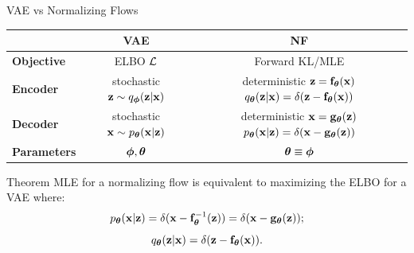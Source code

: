 \documentclass{beamer}
\begin{document}
\begin{frame}{VAE vs Normalizing Flows}
	\begin{table}[]
		\begin{tabular}{l|c|c}
			& \textbf{VAE} & \textbf{NF} \\ \hline
			\textbf{Objective} & ELBO $\mathcal{L}$ & Forward KL/MLE \\ \hline
			\textbf{Encoder} & \shortstack{stochastic \\ $\mathbf{z} \sim q_{\boldsymbol{\phi}}(\mathbf{z}| \mathbf{x})$} &  \shortstack{\\ deterministic \\ $\mathbf{z} = \mathbf{f}_{\boldsymbol{\theta}}(\mathbf{x})$ \\ $q_{\boldsymbol{\theta}}(\mathbf{z}| \mathbf{x}) = \delta(\mathbf{z} - \mathbf{f}_{\boldsymbol{\theta}}(\mathbf{x}))$}  \\ \hline
			\textbf{Decoder} & \shortstack{stochastic \\ $\mathbf{x} \sim p_{\boldsymbol{\theta}}(\mathbf{x}| \mathbf{z})$} & \shortstack{\\ deterministic \\ $\mathbf{x} = \mathbf{g}_{\boldsymbol{\theta}}(\mathbf{z})$ \\ $ p_{\boldsymbol{\theta}}(\mathbf{x} | \mathbf{z}) = \delta(\mathbf{x} - \mathbf{g}_{\boldsymbol{\theta}}(\mathbf{z}))$} \\ \hline
			\textbf{Parameters}  & $\boldsymbol{\phi}, \boldsymbol{\theta}$ & $\boldsymbol{\theta} \equiv \boldsymbol{\phi}$\\ 
		\end{tabular}
	\end{table}
	\vspace{-0.3cm}
	\eqpause
	\begin{block}{Theorem}
		MLE for a normalizing flow is equivalent to maximizing the ELBO for a VAE where:
		\vspace{-0.3cm}
		\[
			p_{\boldsymbol{\theta}}(\mathbf{x} | \mathbf{z}) = \delta (\mathbf{x} - \mathbf{f}^{-1}_{\boldsymbol{\theta}}(\mathbf{z})) = \delta (\mathbf{x} - \mathbf{g}_{\boldsymbol{\theta}}(\mathbf{z}));
		\]
		\[
			q_{\boldsymbol{\theta}}(\mathbf{z}| \mathbf{x}) = \delta (\mathbf{z} - \mathbf{f}_{\boldsymbol{\theta}}(\mathbf{x})).
		\]
	\end{block}
\end{frame}
\end{document}
